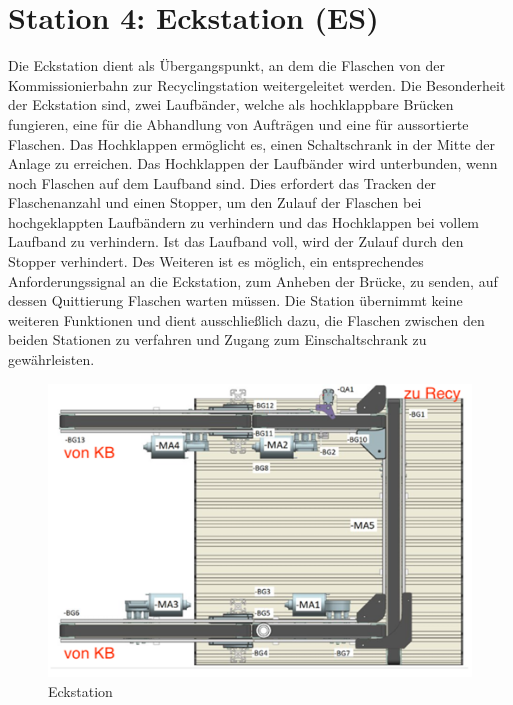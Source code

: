 \section{Station 4: Eckstation (ES)}\label{sec:Station 5: Eckstation}

Die Eckstation dient als Übergangspunkt, an dem die Flaschen von der Kommissionierbahn zur Recyclingstation weitergeleitet werden.
Die Besonderheit der Eckstation sind, zwei Laufbänder, welche als hochklappbare Brücken fungieren, eine für die Abhandlung von 
Aufträgen und eine für aussortierte Flaschen. Das Hochklappen ermöglicht es, 
einen Schaltschrank in der Mitte der Anlage zu erreichen. Das Hochklappen der Laufbänder wird unterbunden, wenn 
noch Flaschen auf dem Laufband sind. Dies erfordert das Tracken der Flaschenanzahl und einen Stopper, um den Zulauf der 
Flaschen bei hochgeklappten Laufbändern zu verhindern und das Hochklappen bei vollem Laufband zu verhindern. Ist das 
Laufband voll, wird der Zulauf durch den Stopper verhindert. Des Weiteren ist es möglich, ein entsprechendes Anforderungssignal an die Eckstation,
zum Anheben der Brücke, zu senden, auf dessen Quittierung Flaschen warten müssen.
Die Station übernimmt keine weiteren Funktionen und dient ausschließlich dazu, die Flaschen zwischen den beiden Stationen zu verfahren und Zugang 
zum Einschaltschrank zu gewährleisten.

\begin{figure}[h!]
    \centering
    \includegraphics*{figures/eckstation.png}
    \caption{Eckstation\cite{siemens2022}} %
    \label{fig:Eckstation} %
\end{figure}
\FloatBarrier


